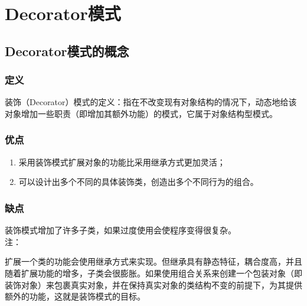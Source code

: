 \chapter{Decorator模式}
\section{Decorator模式的概念}
\subsection{定义}
装饰（Decorator）模式的定义：指在不改变现有对象结构的情况下，动态地给该对象增加一些职责（即增加其额外功能）的模式，它属于对象结构型模式。
\subsection{优点}
\begin{enumerate}
	\item 采用装饰模式扩展对象的功能比采用继承方式更加灵活；
	\item 可以设计出多个不同的具体装饰类，创造出多个不同行为的组合。
\end{enumerate}
\subsection{缺点}
装饰模式增加了许多子类，如果过度使用会使程序变得很复杂。
\\ 注：
\par 扩展一个类的功能会使用继承方式来实现。但继承具有静态特征，耦合度高，并且随着扩展功能的增多，子类会很膨胀。如果使用组合关系来创建一个包装对象（即装饰对象）来包裹真实对象，并在保持真实对象的类结构不变的前提下，为其提供额外的功能，这就是装饰模式的目标。
